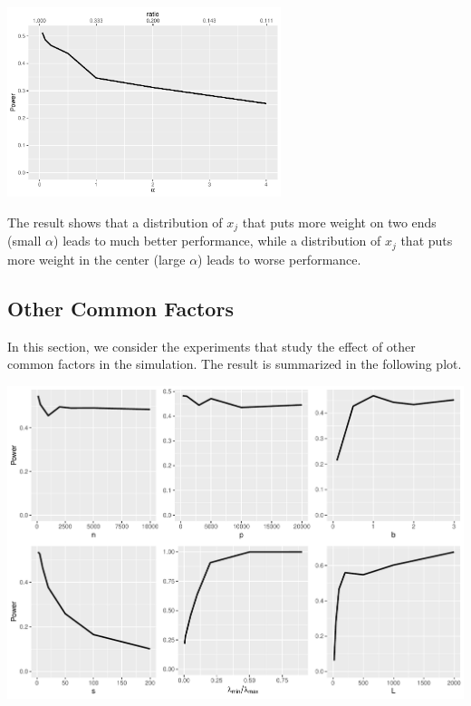 \begin{center}
    \includegraphics[width=0.6\textwidth]{alpha.pdf}
\end{center}

The result shows that a distribution of $x_j$ that puts more weight on two ends (small $\alpha$) leads to much better performance, while a distribution of $x_j$ that puts more weight in the center (large $\alpha$) leads to worse performance.

\subsection{Other Common Factors}

In this section, we consider the experiments that study the effect of other common factors in the simulation. The result is summarized in the following plot.

\begin{center}
    \includegraphics[width=\textwidth]{coxsim.pdf}
\end{center}

